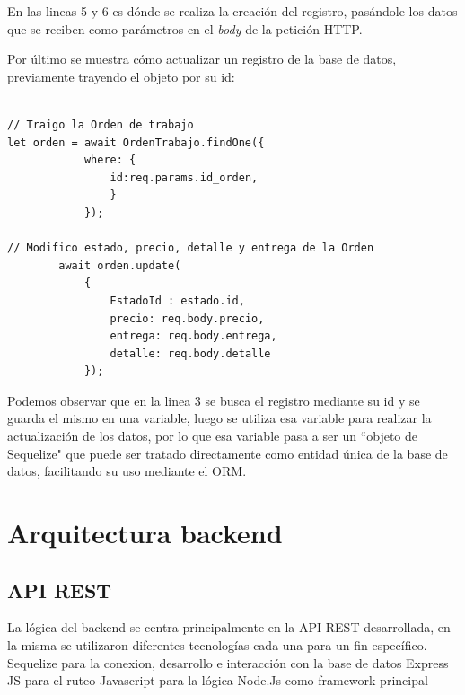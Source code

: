 En las lineas 5 y 6 es dónde se realiza la creación del registro, pasándole los datos que se reciben como parámetros en el \textit{body} de la petición HTTP.

Por último se muestra cómo actualizar un registro de la base de datos, previamente trayendo el objeto por su id:

\begin{lstlisting}[label=cod:updateregistro,caption=Código resumido para actualizar un registro en la base de datos.]

// Traigo la Orden de trabajo
let orden = await OrdenTrabajo.findOne({
            where: {
                id:req.params.id_orden,
                }
            });
            
// Modifico estado, precio, detalle y entrega de la Orden
        await orden.update(
            {
                EstadoId : estado.id,
                precio: req.body.precio,
                entrega: req.body.entrega,
                detalle: req.body.detalle
            });
\end{lstlisting}

Podemos observar que en la linea 3 se busca el registro mediante su id y se guarda el mismo en una variable, luego se utiliza esa variable para realizar la actualización de los datos, por lo que esa variable pasa a ser un ``objeto de Sequelize" que puede ser tratado directamente como entidad única de la base de datos, facilitando su uso mediante el ORM.


\section{Arquitectura backend}
\label{sec:arquitecturabackend}

\subsection{API REST}
\label{subsec:apirest}
La lógica del backend se centra principalmente en la API REST desarrollada, en la misma se utilizaron diferentes tecnologías cada una para un fin específico.
Sequelize para la conexion, desarrollo e interacción con la base de datos
Express JS para el ruteo
Javascript para la lógica
Node.Js como framework principal



